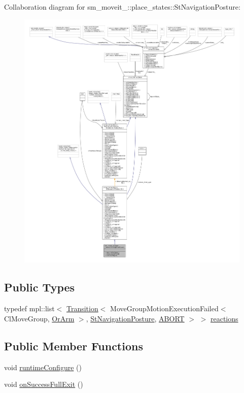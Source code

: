 Collaboration diagram for sm\+\_\+moveit\+\_\+:\+:place\+\_\+states\+:\+:St\+Navigation\+Posture\+:
\nopagebreak
\begin{figure}[H]
\begin{center}
\leavevmode
\includegraphics[width=350pt]{structsm__moveit__4_1_1place__states_1_1StNavigationPosture__coll__graph}
\end{center}
\end{figure}
\subsection*{Public Types}
\begin{DoxyCompactItemize}
\item 
typedef mpl\+::list$<$ \hyperlink{classsmacc_1_1Transition}{Transition}$<$ Move\+Group\+Motion\+Execution\+Failed$<$ Cl\+Move\+Group, \hyperlink{classsm__moveit__4_1_1OrArm}{Or\+Arm} $>$, \hyperlink{structsm__moveit__4_1_1place__states_1_1StNavigationPosture}{St\+Navigation\+Posture}, \hyperlink{structsmacc_1_1default__transition__tags_1_1ABORT}{A\+B\+O\+RT} $>$ $>$ \hyperlink{structsm__moveit__4_1_1place__states_1_1StNavigationPosture_a2588352d77d56f7a1f3df49fe37629d4}{reactions}
\end{DoxyCompactItemize}
\subsection*{Public Member Functions}
\begin{DoxyCompactItemize}
\item 
void \hyperlink{structsm__moveit__4_1_1place__states_1_1StNavigationPosture_aaf8ca02fa5a8185baf6bfc55731b1926}{runtime\+Configure} ()
\item 
void \hyperlink{structsm__moveit__4_1_1place__states_1_1StNavigationPosture_a95ab74dae51538aeae46f71b515bc61e}{on\+Success\+Full\+Exit} ()
\end{DoxyCompactItemize}
